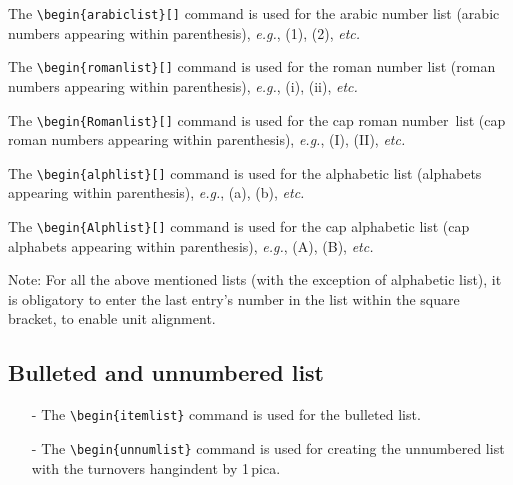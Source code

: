 \documentclass{ws-jai}
\begin{document}
\begin{arabiclist}[(5)]
\item The \verb|\begin{arabiclist}[]| command is used for the arabic
number list (arabic numbers appearing within parenthesis), {\it e.g.},
(1), (2), {\it etc.}

\smallskip

\item The \verb|\begin{romanlist}[]| command is used for the roman
number list (roman numbers appearing within parenthesis), {\it e.g.}, (i),
(ii), {\it etc.}

\smallskip

\item The \verb|\begin{Romanlist}[]| command is used for the cap roman
\hbox{number list} (cap roman numbers appearing within parenthesis),
{\it e.g.}, (I), (II), {\it etc.}

\smallskip

\item The \verb|\begin{alphlist}[]| command is used for the alphabetic
list (alphabets appearing within parenthesis), {\it e.g.}, (a), (b), {\it etc.}

\smallskip

\item The \verb|\begin{Alphlist}[]| command is used for the cap
alphabetic list (cap alphabets appearing within parenthesis),
{\it e.g.}, (A), (B), {\it etc.}
\end{arabiclist}
Note: For all the above mentioned lists (with the exception of
alphabetic list), it is obligatory to enter the last entry's number
in the list within the square bracket, to enable unit alignment.

\subsection{Bulleted and unnumbered list}

\begin{enumerate}[-]
\item[-] The \verb|\begin{itemlist}| command is used for the bulleted list.

\smallskip

\item[-] The \verb|\begin{unnumlist}| command is used for creating the
  unnumbered list with the turnovers hangindent by 1\,pica.
\end{enumerate}
\end{document}
